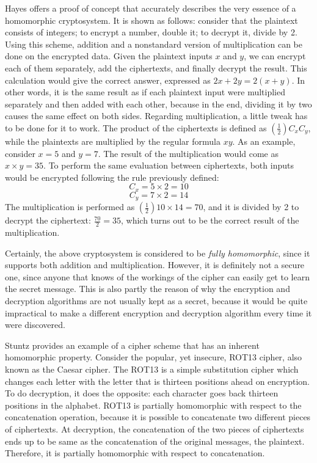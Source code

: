 Hayes \cite{Hayes2012} offers a proof of concept that accurately describes the very essence of a homomorphic cryptosystem. It is shown as follows: consider that the plaintext consists of integers; to encrypt a number, double it; to decrypt it, divide by 2. Using this scheme, addition and a nonstandard version of multiplication can be done on the encrypted data. Given the plaintext inputs $x$ and $y$, we can encrypt each of them separately, add the ciphertexts, and finally decrypt the result. This calculation would give the correct answer, expressed as $2x+2y=2(x+y)$. In other words, it is the same result as if each plaintext input were multiplied separately and then added with each other, because in the end, dividing it by two causes the same effect on both sides. 
Regarding multiplication, a little tweak has to be done for it to work. The product of the ciphertexts is defined as $(\frac{1}{2}) C_x C_y$, while the plaintexts are multiplied by the regular formula $xy$. 
As an example, consider $x=5$ and $y=7$. The result of the multiplication would come as $x \times y = 35$. To perform the same evaluation between ciphertexts, both inputs would be encrypted following the rule previously defined:
\[
C_{x} = 5 \times 2 = 10
\]
\[
C_{y} = 7 \times 2 = 14
\]
The multiplication is performed as $(\frac{1}{2}) 10 \times 14 = 70$, and it is divided by 2 to decrypt the ciphertext: $\frac{70}{2} = 35$, which turns out to be the correct result of the multiplication.

Certainly, the above cryptosystem is considered to be \emph{fully homomorphic}, since it supports both addition and multiplication. However, it is definitely not a secure one, since anyone that knows of the workings of the cipher can easily get to learn the secret message. This is also partly the reason of why the encryption and decryption algorithms are not usually kept as a secret, because it would be quite impractical to make a different encryption and decryption algorithm every time it were discovered. 

Stuntz \cite{stuntz2010} provides an example of a cipher scheme that has an inherent homomorphic property. Consider the popular, yet insecure, ROT13 cipher, also known as the Caesar cipher. The ROT13 is a simple substitution cipher which changes each letter with the letter that is thirteen positions ahead on encryption. To do decryption, it does the opposite: each character goes back thirteen positions in the alphabet. 
ROT13 is partially homomorphic with respect to the concatenation operation, because it is possible to concatenate two different pieces of ciphertexts. At decryption, the concatenation of the two pieces of ciphertexts ends up to be same as the concatenation of the original messages, the plaintext. Therefore, it is partially homomorphic with respect to concatenation. 

